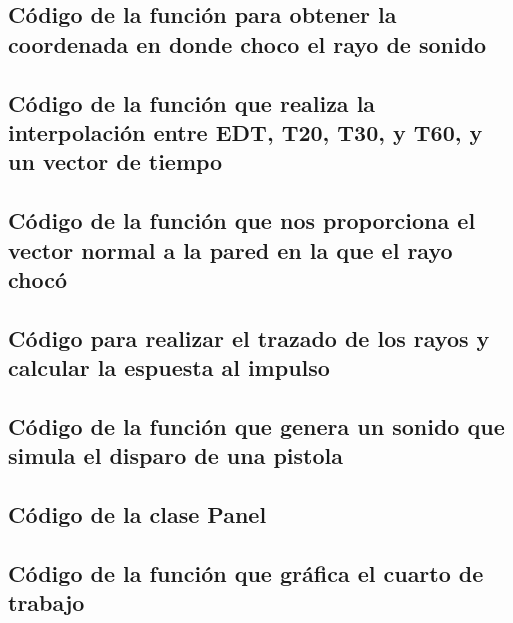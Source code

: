 \subsection{Código de la función para obtener la coordenada en donde choco el rayo de sonido}


\subsection{Código de la función que realiza la interpolación entre EDT, T20, T30, y T60, y un vector de tiempo}


\subsection{Código de la función que nos proporciona el vector normal a la pared en la que el rayo chocó}


\subsection{Código para realizar el trazado de los rayos y calcular la espuesta al impulso}


\subsection{Código de la función que genera un sonido que simula el disparo de una pistola}


\subsection{Código de la clase Panel}


\subsection{Código de la función que gráfica el cuarto de trabajo}



